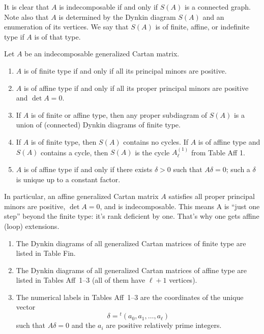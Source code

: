 \documentclass[12pt]{article}
\begin{document}
It is clear that $A$ is indecomposable if and only if $S(A)$ is a connected graph. 
Note also that $A$ is determined by the Dynkin diagram $S(A)$ and an enumeration of its vertices. 
We say that $S(A)$ is of finite, affine, or indefinite type if $A$ is of that type.

\begin{proposition}\label{prop:finite-affine}
Let $A$ be an indecomposable generalized Cartan matrix.
\begin{enumerate}[label=\alph*)]
    \item $A$ is of finite type if and only if all its principal minors are positive.
    \item $A$ is of affine type if and only if all its proper principal minors are positive and $\det A = 0$.
    \item If $A$ is of finite or affine type, then any proper subdiagram of $S(A)$ is a union of (connected) Dynkin diagrams of finite type.
    \item If $A$ is of finite type, then $S(A)$ contains no cycles. 
          If $A$ is of affine type and $S(A)$ contains a cycle, then $S(A)$ is the cycle $A_\ell^{(1)}$ from Table Aff 1.
    \item $A$ is of affine type if and only if there exists $\delta>0$ such that $A\delta=0$; 
          such a $\delta$ is unique up to a constant factor.
\end{enumerate}
\end{proposition}
In particular, an affine generalized Cartan matrix $A$ satisfies all proper principal minors are positive, $\det A = 0$, and is indecomposable. This means A is “just one step” beyond the finite type: it's rank deficient by one. That's why one gets affine (loop) extensions.

\begin{theorem}
\leavevmode
\begin{enumerate}[label=\alph*)]
    \item The Dynkin diagrams of all generalized Cartan matrices of finite type 
    are listed in Table Fin.
    
    \item The Dynkin diagrams of all generalized Cartan matrices of affine type 
    are listed in Tables Aff~1--3 (all of them have $\ell+1$ vertices).
    
    \item The numerical labels in Tables Aff~1--3 are the coordinates of the unique 
    vector \[\delta = {}^t(a_0,a_1,\dots,a_\ell)\] such that $A\delta=0$ and the $a_i$ 
    are positive relatively prime integers.
\end{enumerate}
\end{theorem}
\end{document}
